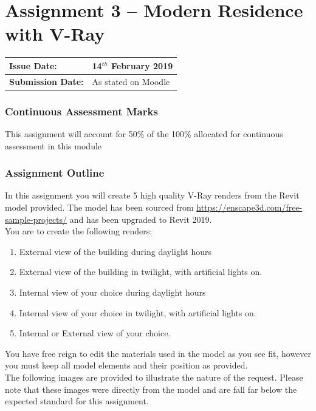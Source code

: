 
	
\part*{Assignment 3 – Modern Residence with V-Ray }

\begin{tabularx}{\textwidth}{ |X|X| }
	\hline
	\textbf{Issue Date:} & 14$^{th}$ February 2019 \\
	\hline 
	\textbf{Submission Date:}  & As stated on Moodle  \\
	\hline
\end{tabularx}


\section*{Continuous Assessment Marks}
This assignment will account for 50\% of the 100\% allocated for continuous assessment in this module

\section*{Assignment Outline}
In this assignment you will create 5 high quality V-Ray renders from the Revit model provided.  The model has been sourced from \href{https://enscape3d.com/free-sample-projects/}{https://enscape3d.com/free-sample-projects/} and has been upgraded to Revit 2019.\\

You are to create the following renders:

\begin{enumerate}
	\item External view of the building during daylight hours
	\item External view of the building in twilight, with artificial lights on.
	\item Internal view of your choice during daylight hours
	\item Internal view of your choice in twilight, with artificial lights on.
	\item Internal or External view of your choice.
\end{enumerate}

You have free reign to edit the materials used in the model as you see fit, however you must keep all model elements and their position as provided.\\

The following images are provided to illustrate the nature of the request.  Please note that these images were directly from the model and are fall far below the expected standard for this assignment. 


